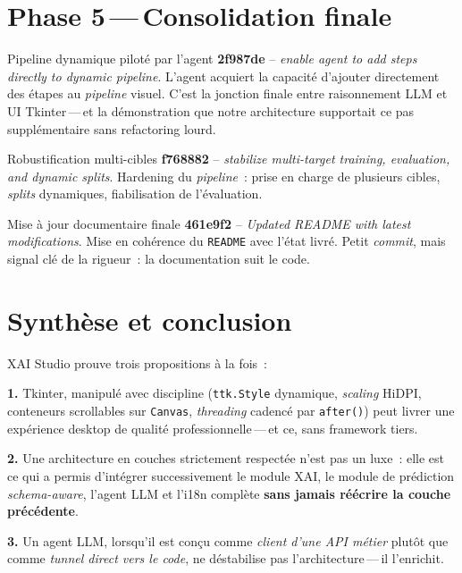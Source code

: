 \documentclass[11pt,a4paper]{report}
\begin{document}
\section{Phase 5\,---\,Consolidation finale}

\begin{milestonebox}{Pipeline dynamique pilot\'e par l'agent}
\textbf{2f987de} -- \textit{enable agent to add steps directly to dynamic pipeline}.
L'agent acquiert la capacit\'e d'ajouter directement des \'etapes
au \textit{pipeline} visuel. C'est la jonction finale entre
raisonnement LLM et UI Tkinter\,---\,et la d\'emonstration que
notre architecture supportait ce pas suppl\'ementaire sans
refactoring lourd.
\end{milestonebox}

\begin{milestonebox}{Robustification multi-cibles}
\textbf{f768882} -- \textit{stabilize multi-target training, evaluation, and dynamic splits}.
Hardening du \textit{pipeline}~: prise en charge de plusieurs
cibles, \textit{splits} dynamiques, fiabilisation de l'\'evaluation.
\end{milestonebox}

\begin{milestonebox}{Mise \`a jour documentaire finale}
\textbf{461e9f2} -- \textit{Updated README with latest modifications}.
Mise en coh\'erence du \texttt{README} avec l'\'etat livr\'e.
Petit \textit{commit}, mais signal cl\'e de la rigueur~: la
documentation suit le code.
\end{milestonebox}

\section{Synth\`ese et conclusion}

\begin{pitchbox}
\sffamily\color{primary}
XAI Studio prouve trois propositions \`a la fois~:

\textbf{1.} Tkinter, manipul\'e avec discipline (\texttt{ttk.Style}
dynamique, \textit{scaling} HiDPI, conteneurs scrollables sur
\texttt{Canvas}, \textit{threading} cadenc\'e par \texttt{after()})
peut livrer une exp\'erience desktop de qualit\'e
professionnelle\,---\,et ce, sans framework tiers.

\textbf{2.} Une architecture en couches strictement respect\'ee
n'est pas un luxe~: elle est ce qui a permis d'int\'egrer
successivement le module XAI, le module de pr\'ediction
\textit{schema-aware}, l'agent LLM et l'i18n compl\`ete \textbf{sans
jamais r\'e\'ecrire la couche pr\'ec\'edente}.

\textbf{3.} Un agent LLM, lorsqu'il est conçu comme \textit{client
d'une API m\'etier} plut\^ot que comme \textit{tunnel direct vers
le code}, ne d\'estabilise pas l'architecture\,---\,il l'enrichit.
\end{pitchbox}
\end{document}
